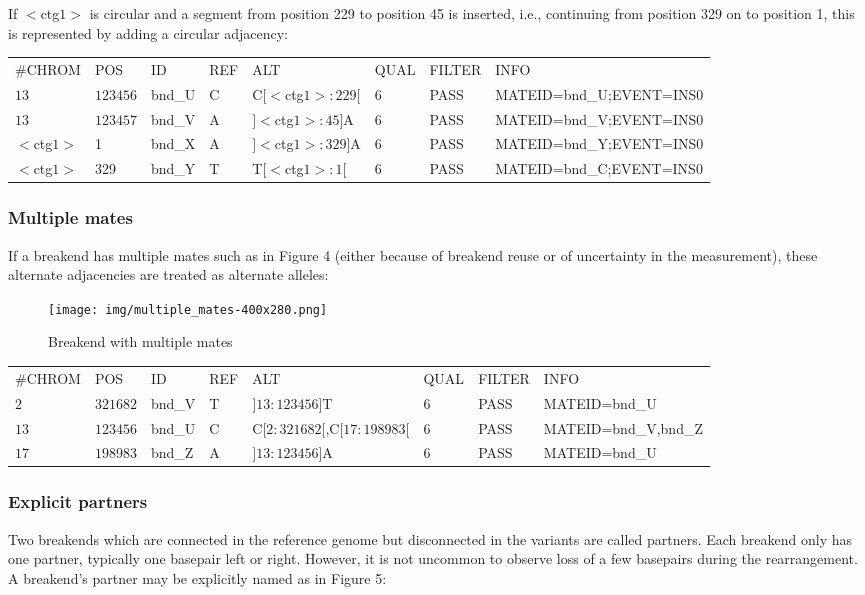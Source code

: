 \documentclass[8pt]{article}
\begin{document}
If $<$ctg$1>$ is circular and a segment from position 229 to position 45 is inserted, i.e., continuing from position 329 on to position 1, this is represented by adding a circular adjacency:

\vspace{0.3cm}
\small
\begin{tabular}{ l l l l l l l l }
\#CHROM & POS & ID & REF & ALT & QUAL & FILTER & INFO \\
$13$ & $123456$ & bnd\_U & C & C$[<$ctg$1>:229[$ & 6 & PASS & MATEID=bnd\_U;EVENT=INS0  \\
$13$ & $123457$ & bnd\_V & A & $]<$ctg$1>:45]$A & 6 & PASS & MATEID=bnd\_V;EVENT=INS0 \\
$<$ctg$1>$ & 1 & bnd\_X & A & $]<$ctg$1>:329]$A & 6 & PASS & MATEID=bnd\_Y;EVENT=INS0 \\
$<$ctg$1>$ & 329 & bnd\_Y & T & T$[<$ctg$1>:1[$ & 6 & PASS & MATEID=bnd\_C;EVENT=INS0 \\
\end{tabular}
\normalsize

\subsubsection{Multiple mates}
If a breakend has multiple mates such as in Figure 4 (either because of breakend reuse or of uncertainty in the measurement), these alternate adjacencies are treated as alternate alleles:

\begin{figure}[h]
\centering
\texttt{[image: img/multiple\_mates-400x280.png]}
\caption{Breakend with multiple mates}
\end{figure}

\footnotesize
\begin{tabular}{ l l l l l l l l }
\#CHROM & POS & ID & REF & ALT & QUAL & FILTER & INFO \\
$2$ & $321682$ & bnd\_V & T & $]13:123456]$T & 6 & PASS & MATEID=bnd\_U \\
$13$ & $123456$ & bnd\_U & C & C$[2:321682[$,C$[17:198983[$ & 6 & PASS & MATEID=bnd\_V,bnd\_Z \\
$17$ & $198983$ & bnd\_Z & A & $]13:123456]$A & 6 & PASS & MATEID=bnd\_U \\
\end{tabular}
\normalsize

\subsubsection{Explicit partners}
\label{explicit-partners}
Two breakends which are connected in the reference genome but disconnected in the variants are called partners.
Each breakend only has one partner, typically one basepair left or right.
However, it is not uncommon to observe loss of a few basepairs during the rearrangement.
A breakend's partner may be explicitly named as in Figure 5:
\end{document}
